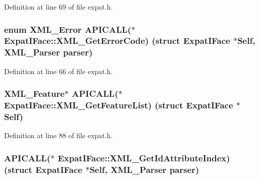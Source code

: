 Definition at line 69 of file expat.\+h.

\subsubsection[{\texorpdfstring{X\+M\+L\+\_\+\+Get\+Error\+Code}{XML_GetErrorCode}}]{\setlength{\rightskip}{0pt plus 5cm}enum {\bf X\+M\+L\+\_\+\+Error} A\+P\+I\+C\+A\+LL($\ast$ Expat\+I\+Face\+::\+X\+M\+L\+\_\+\+Get\+Error\+Code) (struct {\bf Expat\+I\+Face} $\ast$Self, {\bf X\+M\+L\+\_\+\+Parser} parser)}\hypertarget{struct_expat_i_face_ad2c53208191b53f55d42d0c1b3694da3}{}\label{struct_expat_i_face_ad2c53208191b53f55d42d0c1b3694da3}


Definition at line 66 of file expat.\+h.

\subsubsection[{\texorpdfstring{X\+M\+L\+\_\+\+Get\+Feature\+List}{XML_GetFeatureList}}]{ {\bf X\+M\+L\+\_\+\+Feature}$\ast$ A\+P\+I\+C\+A\+LL($\ast$ Expat\+I\+Face\+::\+X\+M\+L\+\_\+\+Get\+Feature\+List) (struct {\bf Expat\+I\+Face} $\ast$Self)}\hypertarget{struct_expat_i_face_a2a8a5223c12b27e14eb4186b9aec923c}{}\label{struct_expat_i_face_a2a8a5223c12b27e14eb4186b9aec923c}


Definition at line 88 of file expat.\+h.

\subsubsection[{\texorpdfstring{X\+M\+L\+\_\+\+Get\+Id\+Attribute\+Index}{XML_GetIdAttributeIndex}}]{ A\+P\+I\+C\+A\+LL($\ast$ Expat\+I\+Face\+::\+X\+M\+L\+\_\+\+Get\+Id\+Attribute\+Index) (struct {\bf Expat\+I\+Face} $\ast$Self, {\bf X\+M\+L\+\_\+\+Parser} parser)}\hypertarget{struct_expat_i_face_a389d90ac5a0468dd5245f846c5328616}{}\label{struct_expat_i_face_a389d90ac5a0468dd5245f846c5328616}


